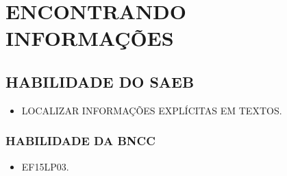 \chapter{ENCONTRANDO INFORMAÇÕES}

\section*{HABILIDADE DO SAEB}

\begin{itemize}
\item \uppercase{Localizar informações explícitas em textos.}
\end{itemize}

\subsection{HABILIDADE DA BNCC}

\begin{itemize}
\item EF15LP03.
\end{itemize}

